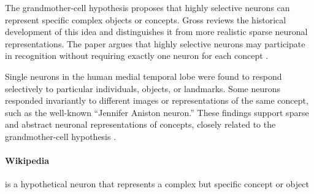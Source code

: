 \documentclass[a4paper]{article}
\title{}
\date{}
\begin{document}
   \maketitle

   The grandmother-cell hypothesis proposes that highly selective neurons can represent specific complex objects or concepts.
   Gross reviews the historical development of this idea and distinguishes it from more realistic sparse neuronal representations.
   The paper argues that highly selective neurons may participate in recognition without requiring exactly one neuron for each concept \cite{gross-2002-genealogy-of-the-grandmother-cell}.

   Single neurons in the human medial temporal lobe were found to respond selectively to particular individuals, objects, or landmarks.
   Some neurons responded invariantly to different images or representations of the same concept, such as the well-known ``Jennifer Aniston neuron.''
   These findings support sparse and abstract neuronal representations of concepts, closely related to the grandmother-cell hypothesis \cite{quiroga-2005-invariant-visual-representation-by-single-neurons-in-the-human-brain}.

            \paragraph{Wikipedia}
               is a hypothetical neuron that represents a complex but specific concept or object 


               
               
\end{document}
